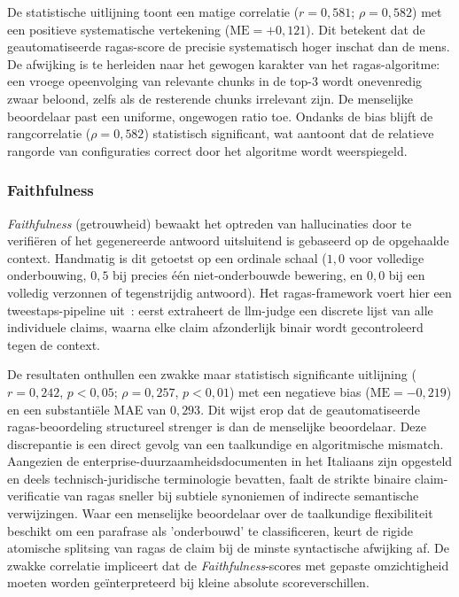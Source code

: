 De statistische uitlijning toont een matige correlatie ($r = 0{,}581$; $\rho = 0{,}582$) met een positieve systematische vertekening ($\text{ME} = +0{,}121$). Dit betekent dat de geautomatiseerde \gls{ragas}-score de precisie systematisch hoger inschat dan de mens. De afwijking is te herleiden naar het gewogen karakter van het \gls{ragas}-algoritme: een vroege opeenvolging van relevante chunks in de top-3 wordt onevenredig zwaar beloond, zelfs als de resterende chunks irrelevant zijn. De menselijke beoordelaar past een uniforme, ongewogen ratio toe. Ondanks de bias blijft de rangcorrelatie ($\rho = 0{,}582$) statistisch significant, wat aantoont dat de relatieve rangorde van configuraties correct door het algoritme wordt weerspiegeld.

\subsubsection{Faithfulness}

\textit{Faithfulness} (getrouwheid) bewaakt het optreden van hallucinaties door te verifiëren of het gegenereerde antwoord uitsluitend is gebaseerd op de opgehaalde context. Handmatig is dit getoetst op een ordinale schaal ($1{,}0$ voor volledige onderbouwing, $0{,}5$ bij precies één niet-onderbouwde bewering, en $0{,}0$ bij een volledig verzonnen of tegenstrijdig antwoord). Het \gls{ragas}-framework voert hier een tweestaps-pipeline uit~\autocite{VibrantLabs2025}: eerst extraheert de \gls{llm}-judge een discrete lijst van alle individuele claims, waarna elke claim afzonderlijk binair wordt gecontroleerd tegen de context.

De resultaten onthullen een zwakke maar statistisch significante uitlijning ($r = 0{,}242$, $p < 0{,}05$; $\rho = 0{,}257$, $p < 0{,}01$) met een negatieve bias ($\text{ME} = -0{,}219$) en een substantiële MAE van $0{,}293$. Dit wijst erop dat de geautomatiseerde \gls{ragas}-beoordeling structureel strenger is dan de menselijke beoordelaar. Deze discrepantie is een direct gevolg van een taalkundige en algoritmische mismatch. Aangezien de enterprise-duurzaamheidsdocumenten in het Italiaans zijn opgesteld en deels technisch-juridische terminologie bevatten, faalt de strikte binaire claim-verificatie van \gls{ragas} sneller bij subtiele synoniemen of indirecte semantische verwijzingen. Waar een menselijke beoordelaar over de taalkundige flexibiliteit beschikt om een parafrase als 'onderbouwd' te classificeren, keurt de rigide atomische splitsing van \gls{ragas} de claim bij de minste syntactische afwijking af. De zwakke correlatie impliceert dat de \textit{Faithfulness}-scores met gepaste omzichtigheid moeten worden geïnterpreteerd bij kleine absolute scoreverschillen.

